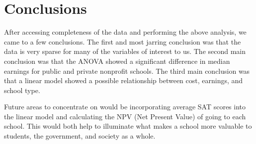 \documentclass[%
 reprint,
 amsmath,amssymb,
 aps,
]{revtex4-1}
\begin{document}
\section{\label{sec:level1}Conclusions}
After accessing completeness of the data and performing the above analysis, we came to a few conclusions.  The first and most jarring conclusion was that the data is very sparse for many of the variables of interest to us.  The second main conclusion was that the ANOVA showed a significant difference in median earnings for public and private nonprofit schools.  The third main conclusion was that a linear model showed a possible relationship between cost, earnings, and school type.

Future areas to concentrate on would be incorporating average SAT scores into the linear model and calculating the NPV (Net Present Value) of going to each school.  This would both help to illuminate what makes a school more valuable to students, the government, and society as a whole.
\end{document}
